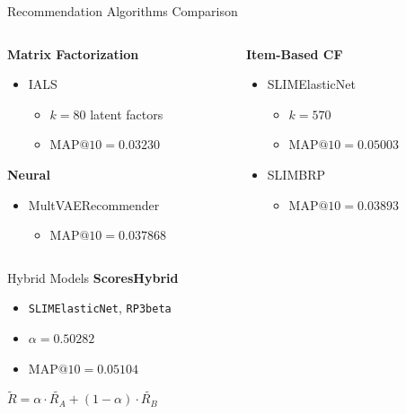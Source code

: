 \documentclass{beamer}
\begin{document}
\begin{frame}{Recommendation Algorithms Comparison}
  \begin{columns}[t]
    \begin{column}{0.5\textwidth}
      \textbf{Matrix Factorization}
      \begin{itemize}
        \item IALS
        \begin{itemize}
          \item $k=80$ latent factors
          \item $\text{MAP@}10=0.03230$
        \end{itemize}
      \end{itemize}
      \textbf{Neural}
      \begin{itemize}
        \item MultVAERecommender
        \begin{itemize}
          \item $\text{MAP@}10=0.037868$
        \end{itemize}
      \end{itemize}
    \end{column}
    
    \begin{column}{0.5\textwidth}
      \textbf{Item-Based CF}
      \begin{itemize}
        \item SLIMElasticNet
        \begin{itemize}
            \item $k=570$
            \item $\text{MAP@}10=0.05003$
        \end{itemize}
        \item SLIMBRP
        \begin{itemize}
            \item $\text{MAP@}10=0.03893$
        \end{itemize}
      \end{itemize}
    \end{column}
  \end{columns}
\end{frame}


\begin{frame}{Hybrid Models}
  \textbf{ScoresHybrid}
  \begin{itemize}
    \item \texttt{SLIMElasticNet}, \texttt{RP3beta}
    \item $\alpha=0.50282$
    \item $\text{MAP@}10=0.05104$
  \end{itemize}
  \vspace{1cm}
  \begin{center}
    $\tilde{R} = \alpha \cdot \tilde{R_{A}} + (1-\alpha) \cdot \tilde{R_{B}}$
  \end{center}
\end{frame}
\end{document}
